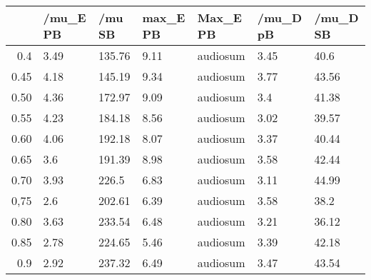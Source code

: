 \begin{table}[ht]
\centering
\begin{tabular}{rllllll}
  \hline
 & /mu\_E PB & /mu SB & max\_E PB & Max\_E PB & /mu\_D pB & /mu\_D SB \\ 
  \hline
0.4 & 3.49 & 135.76 & 9.11 & audiosum & 3.45 & 40.6 \\ 
  0.45 & 4.18 & 145.19 & 9.34 & audiosum & 3.77 & 43.56 \\ 
  0.50 & 4.36 & 172.97 & 9.09 & audiosum & 3.4 & 41.38 \\ 
  0.55 & 4.23 & 184.18 & 8.56 & audiosum & 3.02 & 39.57 \\ 
  0.60 & 4.06 & 192.18 & 8.07 & audiosum & 3.37 & 40.44 \\ 
  0.65 & 3.6 & 191.39 & 8.98 & audiosum & 3.58 & 42.44 \\ 
  0.70 & 3.93 & 226.5 & 6.83 & audiosum & 3.11 & 44.99 \\ 
  0,75 & 2.6 & 202.61 & 6.39 & audiosum & 3.58 & 38.2 \\ 
  0.80 & 3.63 & 233.54 & 6.48 & audiosum & 3.21 & 36.12 \\ 
  0.85 & 2.78 & 224.65 & 5.46 & audiosum & 3.39 & 42.18 \\ 
  0.9 & 2.92 & 237.32 & 6.49 & audiosum & 3.47 & 43.54 \\ 
   \hline
\end{tabular}
\end{table}

